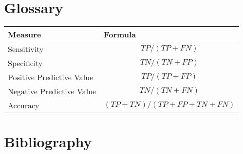 \documentclass[a4paper,12pt]{article}
\begin{document}
\newpage
\section{Glossary}
\begin{tabular}{ll}
\hline
Measure & Formula\\
\hline
Sensitivity & $$TP/(TP + FN)$$\\
Specificity & $$TN/(TN + FP)$$\\
Positive Predictive Value & $$TP/(TP + FP)$$\\
Negative Predictive Value & $$TN/(TN + FN)$$\\
Accuracy & $$(TP + TN)/(TP + FP + TN + FN)$$\\
\hline
\end{tabular}
\newpage
\section{Bibliography}
\end{document}
